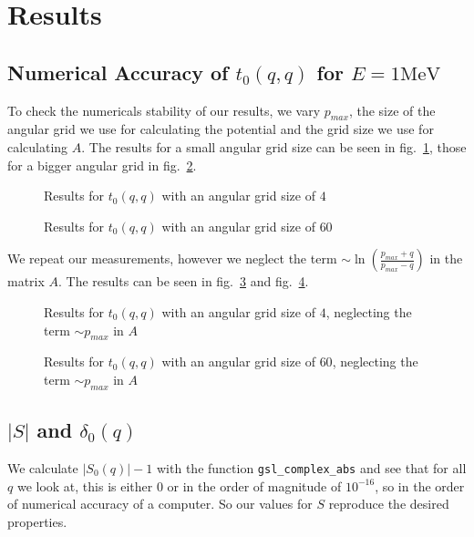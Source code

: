 \documentclass{scrartcl}
\begin{document}

\section{Results}
\subsection{Numerical Accuracy of $t_0(q,q)$ for $E=1\si{\mega\electronvolt}$}

To check the numericals stability of our results, we vary $p_{max}$, the size of the angular grid we use for calculating the potential and the grid size we use for calculating $A$. The results for a small angular grid size can be seen in fig.~\ref{fig:tnnsmallangsize}, those for a bigger angular grid in fig.~\ref{fig:tnnbigangsize}.

\begin{figure}[htbp]
	
	\caption{Results for $t_0(q,q)$ with an angular grid size of $4$}
	\label{fig:tnnsmallangsize}
\end{figure}

\begin{figure}[htbp]
	
	\caption{Results for $t_0(q,q)$ with an angular grid size of $60$}
	\label{fig:tnnbigangsize}
\end{figure}

We repeat our measurements, however we neglect the term $\sim \ln\left(\frac{p_{max}+q}{p_{max}-q}\right)$ in the matrix $A$. The results can be seen in fig.~\ref{fig:tnnsmallangsizewopm} and fig.~\ref{fig:tnnbigangsizewopm}. 

\begin{figure}[htbp]
	
	\caption{Results for $t_0(q,q)$ with an angular grid size of $4$, neglecting the term $\sim p_{max}$ in $A$}
	\label{fig:tnnsmallangsizewopm}
\end{figure}

\begin{figure}[htbp]
	
	\caption{Results for $t_0(q,q)$ with an angular grid size of $60$, neglecting the term $\sim p_{max}$ in $A$}
	\label{fig:tnnbigangsizewopm}
\end{figure}

\subsection{$|S|$ and $\delta_0(q)$}
We calculate $|S_0(q)|-1$ with the function \texttt{gsl\_complex\_abs} and see that for all $q$ we look at, this is either 0 or in the order of magnitude of $10^{-16}$, so in the order of numerical accuracy of a computer. So our values for $S$ reproduce the desired properties. 
\end{document}
